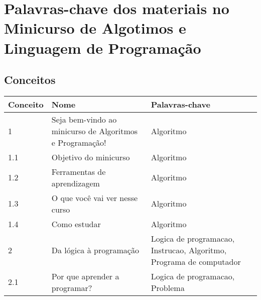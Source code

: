 \chapter{Palavras-chave dos materiais no Minicurso de Algotimos e Linguagem de Programação}\label{ape:dicionario-palavras-chave}

\section{Conceitos}

\begin{longtable}{| p{} | p{} | p{} |}
\hline
Conceito & Nome                                                     & Palavras-chave                                                                                                                \\ \hline
1        & Seja bem-vindo ao minicurso de Algoritmos e Programação! & Algoritmo                                                                                                                     \\ \hline
1.1      & Objetivo do minicurso                                    & Algoritmo                                                                                                                     \\ \hline
1.2      & Ferramentas de aprendizagem                              & Algoritmo                                                                                                                     \\ \hline
1.3      & O que você vai ver nesse curso                           & Algoritmo                                                                                                                     \\ \hline
1.4      & Como estudar                                             & Algoritmo                                                                                                                     \\ \hline
2        & Da lógica à programação                                  & Logica de programacao, Instrucao, Algoritmo, Programa de computador                                                           \\ \hline
2.1      & Por que aprender a programar?                            & Logica de programacao, Problema                                                                                               \\ \hline

\end{longtable}
